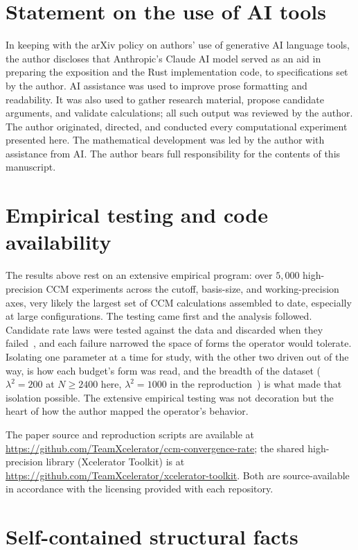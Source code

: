 \documentclass[11pt,a4paper]{article}
\begin{document}
\section*{Statement on the use of AI tools}
In keeping with the arXiv policy on authors' use of generative AI language
tools, the author discloses that Anthropic's Claude AI model served as an aid
in preparing the exposition and the Rust implementation code, to specifications
set by the author. AI assistance was used to improve prose formatting and
readability. It was also used to gather research material, propose candidate
arguments, and validate calculations; all such output was reviewed by the
author. The author originated, directed, and conducted every computational
experiment presented here. The mathematical development was led by the author
with assistance from AI. The author bears full responsibility for the contents
of this manuscript.

\section*{Empirical testing and code availability}
The results above rest on an extensive empirical program: over $5{,}000$
high-precision CCM experiments across the cutoff, basis-size, and
working-precision axes, very likely the largest set of CCM calculations
assembled to date, especially at large configurations. The testing came first
and the analysis followed. Candidate rate laws were tested against the data and
discarded when they failed~\cite{AndrewsB}, and each failure narrowed the space
of forms the operator would tolerate. Isolating one parameter at a time for
study, with the other two driven out of the way, is how each budget's form was
read, and the breadth of the dataset ($\lambda^2=200$ at $N\ge2400$ here,
$\lambda^2=1000$ in the reproduction~\cite{AndrewsA}) is what made that
isolation possible. The extensive empirical testing was not decoration but the
heart of how the author mapped the operator's behavior.

The paper source and reproduction scripts are available at
\url{https://github.com/TeamXcelerator/ccm-convergence-rate}; the shared
high-precision library (Xcelerator Toolkit) is at
\url{https://github.com/TeamXcelerator/xcelerator-toolkit}. Both are
source-available in accordance with the licensing provided with each repository.

\appendix
\section{Self-contained structural facts}\label{app:selfcontained}
\end{document}
